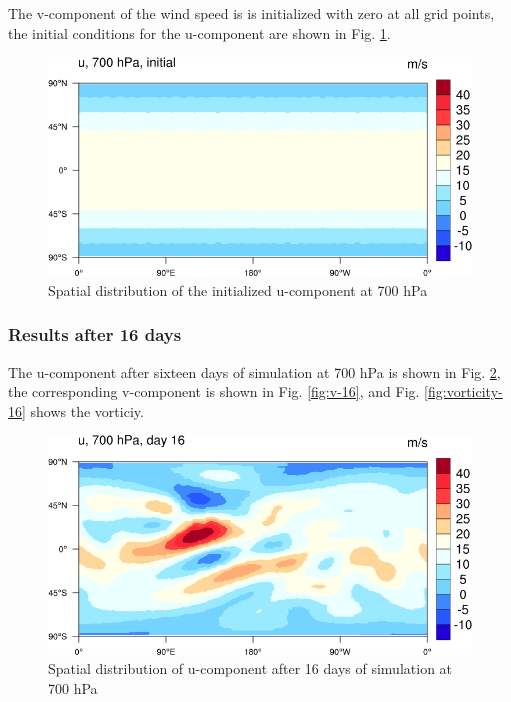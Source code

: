 The v-component of the wind speed is is initialized with zero at all grid points, the initial conditions for the u-component are shown in Fig. \ref{fig:u-initial}.

\begin{figure}[h!]%
\centering
\includegraphics[width=0.95\linewidth]{pictures/u_initial_v2-small.png}
\caption{Spatial distribution of the initialized u-component at 700 hPa}\label{fig:u-initial}
\end{figure}



\subsubsection{Results after 16 days}



The u-component after sixteen days of simulation at 700 hPa is shown in Fig. \ref{fig:u-16}, the corresponding v-component is shown in Fig. \ref{fig:v-16}, and Fig. \ref{fig:vorticity-16} shows the vorticiy.

\begin{figure}[h!]%
\centering
\includegraphics[width=0.95\linewidth]{pictures/u-day-16-small.png}
\caption{Spatial distribution of u-component after 16 days of simulation at 700 hPa}\label{fig:u-16}
\end{figure}


